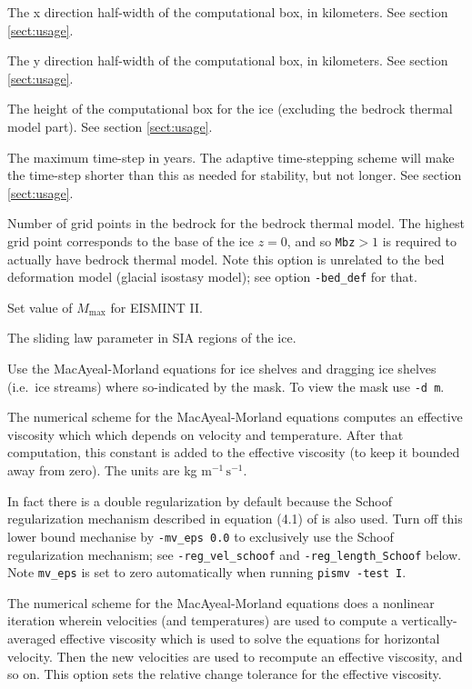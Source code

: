 \documentclass[11pt,final]{amsart}
\renewcommand{\t}[1]{\texttt{#1}}
\begin{document}
  The x direction half-width of the computational box, in kilometers.  See section \ref{sect:usage}.

  The y direction half-width of the computational box, in kilometers.  See section \ref{sect:usage}.

  The height of the computational box for the ice (excluding the bedrock thermal model part).  See section \ref{sect:usage}.

  The maximum time-step in years.  The adaptive time-stepping scheme will make the time-step shorter than this as needed for stability, but not longer.  See section \ref{sect:usage}.

  Number of grid points in the bedrock for the bedrock thermal model.  The highest grid point corresponds to the base of the ice $z=0$, and so \t{Mbz}$>1$ is required to actually have bedrock thermal model.  Note this option is unrelated to the bed deformation model (glacial isostasy model); see option \verb|-bed_def| for that.

  Set value of $M_{\text{max}}$ for EISMINT II.

  The sliding law parameter in SIA regions of the ice.

  Use the MacAyeal-Morland equations  \cite{MacAyeal} for ice shelves and dragging ice shelves (i.e.~ice streams) where so-indicated by the mask.  To view the mask use \verb|-d m|.

  The numerical scheme for the MacAyeal-Morland equations computes an effective viscosity which which depends on velocity and temperature.  After that computation, this constant is added to the effective viscosity (to keep it bounded away from zero).  The units are kg $\text{m}^{-1}\,\text{s}^{-1}$. 

In fact there is a double regularization by default because the Schoof regularization mechanism described in equation (4.1) of \cite{SchoofStream} is also used.  Turn off this lower bound mechanise by \verb|-mv_eps 0.0| to exclusively use the Schoof regularization mechanism; see \verb|-reg_vel_schoof| and \verb|-reg_length_Schoof| below.  Note \verb|mv_eps| is set to zero automatically when running \verb|pismv -test I|.

  The numerical scheme for the MacAyeal-Morland equations does a nonlinear iteration wherein velocities (and temperatures) are used to compute a vertically-averaged effective viscosity which is used to solve the equations for horizontal velocity.  Then the new velocities are used to recompute an effective viscosity, and so on.  This option sets the relative change tolerance for the effective viscosity.
\end{document}
